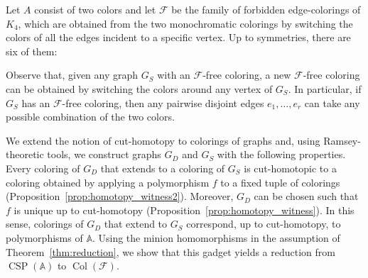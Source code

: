 \documentclass[oneside]{amsart}
\DeclareMathOperator{\col}{Col}
\newcommand{\str}[1]{\mathbb{#1}}
\newcommand{\cat}[1]{\mathcal{#1}}
\newcommand{\CSP}{\operatorname{CSP}}
\begin{document}
\begin{exam}
    Let $A$ consist of two colors and let $\cat F$ be the family of forbidden edge-colorings of $K_4$, which are obtained from the two monochromatic colorings by switching the colors of all the edges incident to a specific vertex. Up to symmetries, there are six of them: 
\begin{center}

\newcommand{\blackedge}[2]{\draw[color=cbBlue, line width=1.2pt] (#1) -- (#2);
}
\newcommand{\rededge}[2]{\draw[color=cbRed, line width=1.2pt] (#1) -- (#2);
}
 
\newcommand{\kfouredge}[3]{\def\colorblack{black}\def\givencolor{#1}\ifx\givencolor\colorblack
    \draw[color=cbBlue, line width=1.2pt] (#2) -- (#3);
  \else
    \draw[color=cbRed, line width=1.2pt] (#2) -- (#3);
  \fi
}
 
\newcommand{\kfour}[7]{\begin{scope}[xshift=#1, line join=miter, line cap=rect]
    \kfouredge{#5}{1,0}{0,-1}
    \kfouredge{#4}{0,0}{1,-1}
    \kfouredge{#2}{0,0}{1,0}
    \kfouredge{#3}{0,0}{0,-1}
    \kfouredge{#6}{1,0}{1,-1}
    \kfouredge{#7}{0,-1}{1,-1}
    \foreach \x/\y in {0/0, 1/0, 0/-1, 1/-1} {
      \fill[black] (\x,\y) circle (2pt);
    }
  \end{scope}
}
 
 
\end{center}
    Observe that, given any graph $G_S$ with an $\cat F$-free coloring, a new $\cat F$-free coloring can be obtained by switching the colors around any vertex of $G_S$.
    In particular, if $G_S$ has an $\cat F$-free coloring, then any pairwise disjoint edges $e_1,\dots,e_r$ can take any possible combination of the two colors.
\end{exam}

We extend the notion of cut-homotopy to colorings of graphs and, using Ramsey-theoretic tools, we construct graphs $G_D$ and $G_S$ with the following properties.
Every coloring of $G_D$ that extends to a coloring of $G_S$ is cut-homotopic to a coloring obtained by applying a polymorphism $f$ to a fixed tuple of colorings (Proposition~\ref{prop:homotopy_witness2}).
Moreover, $G_D$ can be chosen such that $f$ is unique up to cut-homotopy (Proposition~\ref{prop:homotopy_witness}).
In this sense, colorings of $G_D$ that extend to $G_S$ correspond, up to cut-homotopy, to polymorphisms of $\str A$.
Using the minion homomorphisms in the assumption of Theorem~\ref{thm:reduction}, we show that this gadget yields a reduction from $\CSP(\str A)$ to $\col(\cat F)$.
\end{document}
